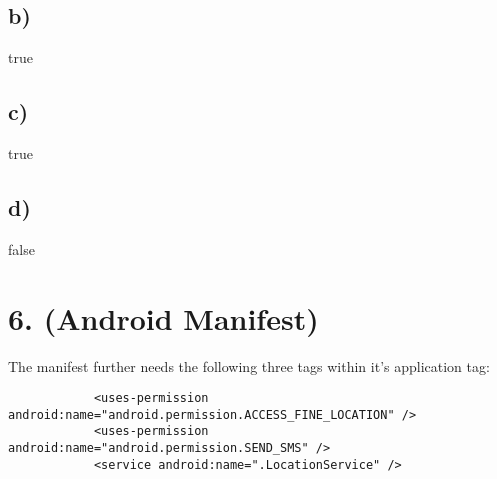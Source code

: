 \documentclass[10pt,a4paper]{report}
\begin{document}
		\subsection*{b)}
			true
		
		\subsection*{c)}
			true
		
		\subsection*{d)}
			false
	
	\section*{6. (Android Manifest)}
		The manifest further needs the following three tags within it's application tag: \\
		\begin{lstlisting}
			<uses-permission android:name="android.permission.ACCESS_FINE_LOCATION" />
			<uses-permission android:name="android.permission.SEND_SMS" />
			<service android:name=".LocationService" />
		\end{lstlisting}
	
\end{document}
